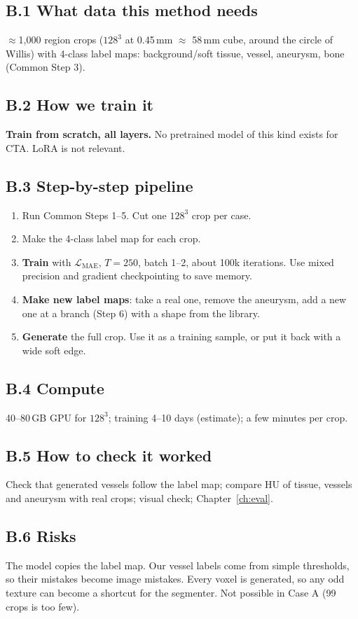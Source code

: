 \documentclass[11pt,a4paper,oneside]{report}
\newcommand{\Loss}{\mathcal{L}}
\begin{document}
\subsection*{B.1 What data this method needs}
$\approx$1{,}000 region crops ($128^3$ at 0.45\,mm $\approx$ 58\,mm cube, around the circle of Willis) with 4-class label maps: background/soft tissue, vessel, aneurysm, bone (Common Step 3).

\subsection*{B.2 How we train it}
\textbf{Train from scratch, all layers.} No pretrained model of this kind exists for CTA. LoRA is not relevant.

\subsection*{B.3 Step-by-step pipeline}
\begin{enumerate}
  \item Run Common Steps 1--5. Cut one $128^3$ crop per case.
  \item Make the 4-class label map for each crop.
  \item \textbf{Train} with $\Loss_{\text{MAE}}$, $T=250$, batch 1--2, about 100k iterations. Use mixed precision and gradient checkpointing to save memory.
  \item \textbf{Make new label maps}: take a real one, remove the aneurysm, add a new one at a branch (Step 6) with a shape from the library.
  \item \textbf{Generate} the full crop. Use it as a training sample, or put it back with a wide soft edge.
\end{enumerate}

\subsection*{B.4 Compute}
40--80\,GB GPU for $128^3$; training 4--10 days (estimate); a few minutes per crop.

\subsection*{B.5 How to check it worked}
Check that generated vessels follow the label map; compare HU of tissue, vessels and aneurysm with real crops; visual check; Chapter~\ref{ch:eval}.

\subsection*{B.6 Risks}
\begin{caution}
The model copies the label map. Our vessel labels come from simple thresholds, so their mistakes become image mistakes. Every voxel is generated, so any odd texture can become a shortcut for the segmenter. Not possible in Case A (99 crops is too few).
\end{caution}
\end{document}
